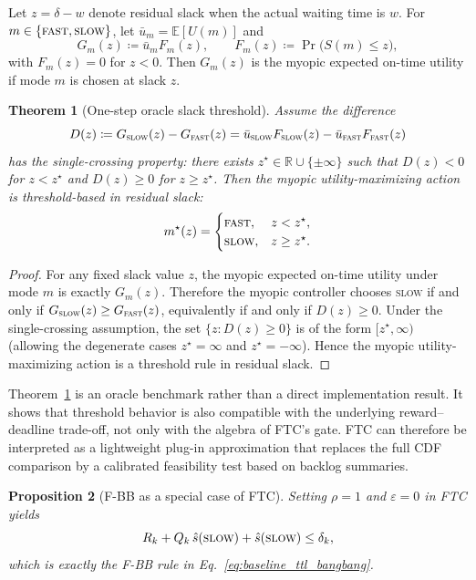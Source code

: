 \documentclass[fleqn,12pt,lineno]{wlpeerj}
\newtheorem{theorem}{Theorem}[section]
\newtheorem{proposition}[theorem]{Proposition}
\begin{document}
Let $z=\delta-w$ denote residual slack when the actual waiting time is $w$. For $m\in\{\textsc{fast},\textsc{slow}\}$, let $\bar u_m = \mathbb E[U(m)]$ and
\[
G_m(z)\coloneqq \bar u_m F_m(z),
\qquad
F_m(z)\coloneqq \Pr\!\bigl(S(m)\le z\bigr),
\]
with $F_m(z)=0$ for $z<0$. Then $G_m(z)$ is the myopic expected on-time utility if mode $m$ is chosen at slack $z$.

\begin{theorem}[One-step oracle slack threshold]
\label{thm:oracle_threshold}
Assume the difference
\[
D(z)\coloneqq G_{\textsc{slow}}(z)-G_{\textsc{fast}}(z)
= \bar u_{\textsc{slow}}F_{\textsc{slow}}(z)-\bar u_{\textsc{fast}}F_{\textsc{fast}}(z)
\]
has the single-crossing property: there exists $z^{\star}\in\mathbb R\cup\{\pm\infty\}$ such that $D(z)<0$ for $z<z^{\star}$ and $D(z)\ge 0$ for $z\ge z^{\star}$. Then the myopic utility-maximizing action is threshold-based in residual slack:
\[
m^{\star}(z)=
\begin{cases}
\textsc{fast}, & z<z^{\star},\\
\textsc{slow}, & z\ge z^{\star}.
\end{cases}
\]
\end{theorem}

\begin{proof}
For any fixed slack value $z$, the myopic expected on-time utility under mode $m$ is exactly $G_m(z)$. Therefore the myopic controller chooses \textsc{slow} if and only if $G_{\textsc{slow}}(z)\ge G_{\textsc{fast}}(z)$, equivalently if and only if $D(z)\ge 0$. Under the single-crossing assumption, the set $\{z:D(z)\ge 0\}$ is of the form $[z^{\star},\infty)$ (allowing the degenerate cases $z^{\star}=\infty$ and $z^{\star}=-\infty$). Hence the myopic utility-maximizing action is a threshold rule in residual slack.
\end{proof}

Theorem~\ref{thm:oracle_threshold} is an oracle benchmark rather than a direct implementation result. It shows that threshold behavior is also compatible with the underlying reward--deadline trade-off, not only with the algebra of FTC's gate. FTC can therefore be interpreted as a lightweight plug-in approximation that replaces the full CDF comparison by a calibrated feasibility test based on backlog summaries.

\begin{proposition}[F-BB as a special case of FTC]
\label{prop:fbb_special_case}
Setting $\rho=1$ and $\varepsilon=0$ in FTC yields
\[
R_k + Q_k\,\hat{s}(\textsc{slow}) + \hat{s}(\textsc{slow}) \le \delta_k,
\]
which is exactly the F-BB rule in Eq.~\eqref{eq:baseline_ttl_bangbang}.
\end{proposition}
\end{document}
